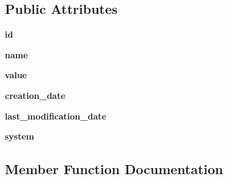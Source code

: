 \subsection*{Public Attributes}
\begin{DoxyCompactItemize}
\item 
{\bfseries id}\hypertarget{classplume-creator_1_1src_1_1plume_1_1gui_1_1property_1_1_property_a2a59fa133be6c02c304732d865db6b9c}{}\label{classplume-creator_1_1src_1_1plume_1_1gui_1_1property_1_1_property_a2a59fa133be6c02c304732d865db6b9c}

\item 
{\bfseries name}\hypertarget{classplume-creator_1_1src_1_1plume_1_1gui_1_1property_1_1_property_a9f319c1a8b9508f2ff8ccf236e75c1fc}{}\label{classplume-creator_1_1src_1_1plume_1_1gui_1_1property_1_1_property_a9f319c1a8b9508f2ff8ccf236e75c1fc}

\item 
{\bfseries value}\hypertarget{classplume-creator_1_1src_1_1plume_1_1gui_1_1property_1_1_property_a1d8713a3ecb0d600361986f0773ea59c}{}\label{classplume-creator_1_1src_1_1plume_1_1gui_1_1property_1_1_property_a1d8713a3ecb0d600361986f0773ea59c}

\item 
{\bfseries creation\+\_\+date}\hypertarget{classplume-creator_1_1src_1_1plume_1_1gui_1_1property_1_1_property_a4dcc1d027f561cb2eef517d563c91d01}{}\label{classplume-creator_1_1src_1_1plume_1_1gui_1_1property_1_1_property_a4dcc1d027f561cb2eef517d563c91d01}

\item 
{\bfseries last\+\_\+modification\+\_\+date}\hypertarget{classplume-creator_1_1src_1_1plume_1_1gui_1_1property_1_1_property_ad6ad4ac709271b80972d3da63101dc10}{}\label{classplume-creator_1_1src_1_1plume_1_1gui_1_1property_1_1_property_ad6ad4ac709271b80972d3da63101dc10}

\item 
{\bfseries system}\hypertarget{classplume-creator_1_1src_1_1plume_1_1gui_1_1property_1_1_property_a224918e2cbd3290a42b374048b89308f}{}\label{classplume-creator_1_1src_1_1plume_1_1gui_1_1property_1_1_property_a224918e2cbd3290a42b374048b89308f}

\end{DoxyCompactItemize}


\subsection{Member Function Documentation}
